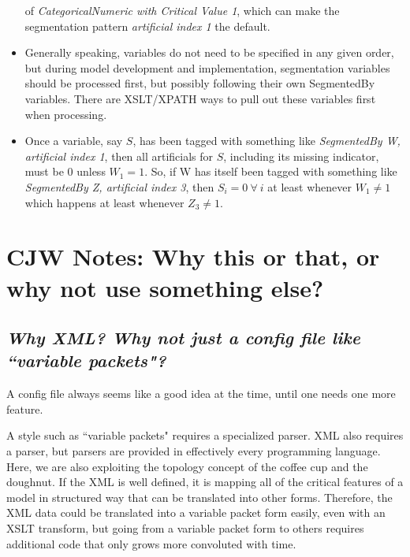 \documentclass[10pt]{article}
\begin{document}
\begin{itemize}
        of {\em CategoricalNumeric with Critical Value 1}, which can make the segmentation pattern {\em artificial index 1}
        the default.
    \item Generally speaking, variables do not need to be specified in any given order, but during model 
        development and implementation, segmentation variables should be processed first, but possibly following their own SegmentedBy
        variables.  There are XSLT/XPATH ways to pull out these variables first when processing.
    \item Once a variable, say $S$, has been tagged with something like {\em SegmentedBy W, artificial index 1}, 
        then all artificials for $S$, including its missing indicator, must be 0 unless $W_1=1$.
        So, if W has itself been tagged with something like {\em SegmentedBy Z, artificial index 3}, then
        $S_i=0~\forall~i$ at least whenever $W_1 \ne 1$ which happens at least whenever $Z_3 \ne 1$.
\end{itemize}











\ifcommentary


\section{\label{why} CJW Notes: Why this or that, or why not use something else?}
\subsection{\em Why XML? Why not just a config file like ``variable packets"?} 
A config file always seems like a good idea at the time, until one needs one more feature.

A style such as ``variable packets" requires a specialized parser. XML also requires a parser, but
parsers are provided in effectively every programming language. Here, we are also exploiting the topology concept 
of the coffee cup and the doughnut.  If the XML is well defined, it is mapping all of the critical features of a
model in structured way that can be translated into other forms. Therefore, the XML data could be translated into
a variable packet form easily, even with an XSLT transform, but going from a variable packet form to others requires
additional code that only grows more convoluted with time.
\end{document}

